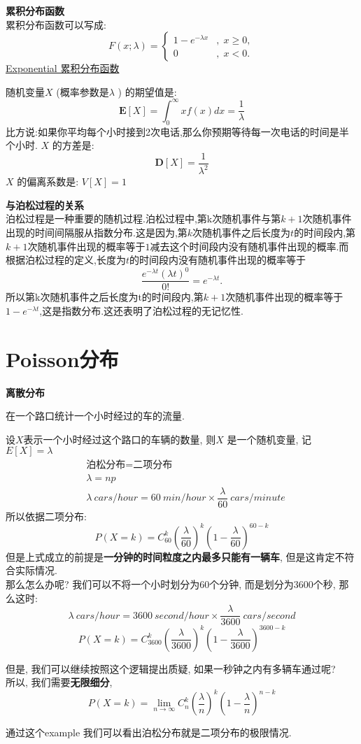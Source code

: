 \documentclass{article}
\begin{document}
\textbf{累积分布函数}\\
累积分布函数可以写成:
$$F(x;\lambda )=\left\{{\begin{matrix}1-e^{{-\lambda x}}&,\;x\geq 0,\\0&,\;x<0.\end{matrix}}\right.$$
\href{http://upload.wikimedia.org/wikipedia/commons/thumb/b/b1/Exponential\_distribution\_pdf.png/800px-Exponential\_distribution\_pdf.png}{Exponential 累积分布函数}
	
随机变量$X$ (概率参数是$\lambda$ ) 的期望值是:
$$
{\mathbf  {E}}[X]=\int_0^{\infty} xf(x)dx = {\frac  {1}{\lambda }}
$$
比方说:如果你平均每个小时接到2次电话,那么你预期等待每一次电话的时间是半个小时.
$X$ 的方差是:
$${\mathbf  {D}}[X]={\frac{1}{\lambda ^{2}}}
$$
$X$ 的偏离系数是: $V[X] = 1$

\textbf{与泊松过程的关系}\\
泊松过程是一种重要的随机过程.泊松过程中,第k次随机事件与第$k+1$次随机事件出现的时间间隔服从指数分布.这是因为,第$k$次随机事件之后长度为$t$的时间段内,第$k+1$次随机事件出现的概率等于$1$减去这个时间段内没有随机事件出现的概率.而根据泊松过程的定义,长度为$t$的时间段内没有随机事件出现的概率等于
$$
{\frac  {e^{{-\lambda t}}(\lambda t)^{0}}{0!}}=e^{{-\lambda t}}.
$$
所以第k次随机事件之后长度为t的时间段内,第$k+1$次随机事件出现的概率等于$1-e^{{-\lambda t}}$,这是指数分布.这还表明了泊松过程的无记忆性.

\section{Poisson分布}
\label{sec.distribution.poisson}
\textbf{离散分布}

\begin{example}
在一个路口统计一个小时经过的车的流量.

设$X$表示一个小时经过这个路口的车辆的数量, 则$X$ 是一个随机变量, 记$E[X] = \lambda$
$$
\begin{aligned}
		&\text{泊松分布}  =  \text{二项分布}\\
		&\lambda  =  np \\
		&\lambda \ cars/hour   =  60\ min/hour \times \dfrac{\lambda}{60}\ cars/minute
\end{aligned}
$$
所以依据二项分布:
$$P(X=k) = C_{60}^k (\dfrac{\lambda}{60})^k (1 - \dfrac{\lambda}{60})^{60 - k}$$
但是上式成立的前提是\textbf{一分钟的时间粒度之内最多只能有一辆车}, 但是这肯定不符合实际情况.\\
那么怎么办呢? 我们可以不将一个小时划分为60个分钟, 而是划分为3600个秒, 那么这时:
$$\lambda\ cars/hour = 3600\ second/hour \times \dfrac{\lambda}{3600}\ cars/second$$
$$P(X=k) = C_{3600}^k (\dfrac{\lambda}{3600})^k (1 - \dfrac{\lambda}{3600})^{3600 - k}$$

但是, 我们可以继续按照这个逻辑提出质疑, 如果一秒钟之内有多辆车通过呢?\\
所以, 我们需要\textbf{无限细分},
$$P(X=k) = \lim_{n \to \infty}C_{n}^k (\dfrac{\lambda}{n})^k (1 - \dfrac{\lambda}{n})^{n - k}$$

通过这个example 我们可以看出泊松分布就是二项分布的极限情况.
\end{example}
\end{document}
